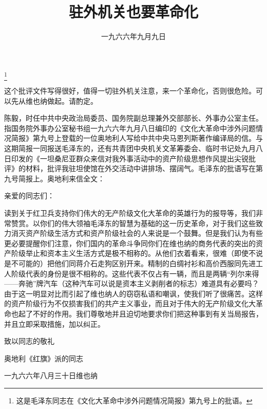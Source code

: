 
\title{驻外机关也要革命化}
\date{一九六六年九月九日}
\thanks{这是毛泽东同志在《文化大革命中涉外问题情况简报》第九号上的批语。}
\maketitle



这个批评文件写得很好，值得一切驻外机关注意，来一个革命化，否则很危险。可以先从维也纳做起。请酌定。

\begin{maonote}
陈毅，时任中共中央政治局委员、国务院副总理兼外交部部长、外事办公室主任。
指国务院外事办公室秘书组一九六六年九月八日编印的《文化大革命中涉外问题情况简报》第九号上登载的一位奥地利人写给中共中央马恩列斯著作编译局的信。与这期简报一同报送毛泽东的，还有共青团中央机关文革筹委会、临时书记处九月八日印发的《一坦桑尼亚群众来信对我外事活动中的资产阶级思想作风提出尖锐批评》的材料，批评我驻坦使馆在外交活动中讲排场、摆阔气。毛泽东的批语写在第九号简报上。奥地利来信全文：

亲爱的同志们：

读到关于红卫兵支持你们伟大的无产阶级文化大革命的英雄行为的报导等，我们非常赞赏。以你们的伟大领袖毛泽东的智慧为基础的这一历史革命，对于我们这些致力消灭资产阶级生活方式和资产阶级社会的人来说是一个鼓舞。但是我们认为有些更必要提醒你们注意，你们国内的革命斗争同你们在维也纳的商务代表的突出的资产阶级举止和资本主义生活方式是极不相称的。从他们衣着看来，很难（即使不说是不可能的）把他们同蒋介石走狗区别开来。精制的白绸衬衫和高价西服同先进工人阶级代表的身份是很不相称的。这些代表不仅占有一辆，而且是两辆“列尔来得——奔驰”牌汽车（这种汽车可以说是资本主义剥削者的标志）难道具有必要吗？由于这一明显对比而引起了维也纳人的窃窃私语和嘲讽，使我们听了很痛苦。这样的资产阶级行为不仅损害我们的共产主义事业，而且对于伟大的无产阶级文化大革命也起了不好的作用。我们尊敬地并且迫切地要求你们把这种事到有关当局报告，并且立即采取措施，加以纠正。

致以同志的敬礼

奥地利《红旗》派的同志

一九六六年八月三十日维也纳
\end{maonote}
